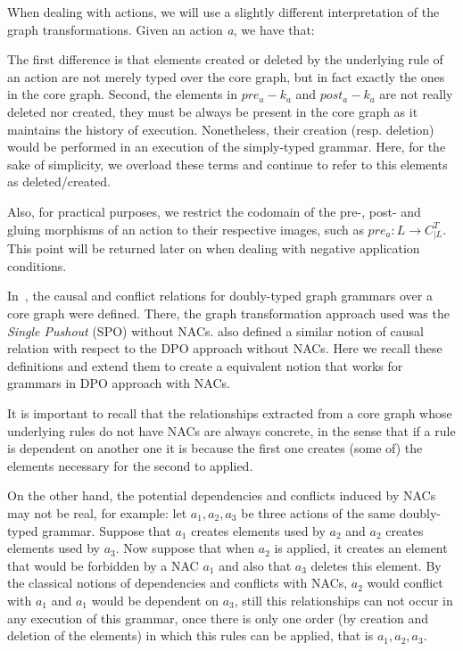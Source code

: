 \begin{remark} When dealing with actions, we will use a slightly different interpretation of the graph transformations. Given an action \emph{a}, we have that:
  
\hfill %

The first difference is that elements created or deleted by the underlying rule of an action are not merely typed over the core graph, but in fact exactly the ones in the core graph. Second, the elements in $pre_a - k_a$ and $post_a - k_a$ are not really deleted nor created, they must be always be present in the core graph as it maintains the history of execution. Nonetheless, their creation (resp. deletion) would be performed in an execution of the simply-typed grammar. Here, for the sake of
  simplicity, we overload these terms and continue to refer to this elements as deleted/created.

  Also, for practical purposes, we restrict the codomain of the pre-, post- and gluing morphisms of an action to their respective images, such as $pre_a : L \rightarrow C^T_{|L}$. This point will be returned later on when dealing with negative application conditions.
\end{remark}

In~\cite{Ribeiro1996}, the causal and conflict relations for doubly-typed graph grammars over a core graph were defined. There, the graph transformation approach used was the \emph{Single Pushout} (SPO) without NACs. \cite{Corradini1996} also defined a similar notion of causal relation with respect to the DPO approach without NACs. Here we recall these definitions and extend them to create a equivalent notion that works for grammars in DPO approach with NACs.

It is important to recall that the relationships extracted from a core graph whose underlying rules do not have NACs are always concrete, in the sense that if a rule is dependent on another one it is because the first one creates (some of) the elements necessary for the second to applied.

On the other hand, the potential dependencies and conflicts induced by NACs may not be real, for example: let $a_1, a_2, a_3$ be three actions of the same doubly-typed grammar. Suppose that $a_1$ creates elements used by $a_2$ and $a_2$ creates elements used by $a_3$. 
Now suppose that when $a_2$ is applied, it creates an element that would be forbidden by a NAC $a_1$ and also that $a_3$ deletes this element. By the classical notions of dependencies and conflicts with NACs, $a_2$ would conflict with $a_1$ and $a_1$ would be dependent on $a_3$, still this relationships can not occur in any execution of this grammar, once there is only one order (by creation and deletion of the elements) in which this rules can be applied, that is
$a_1,a_2,a_3$.

